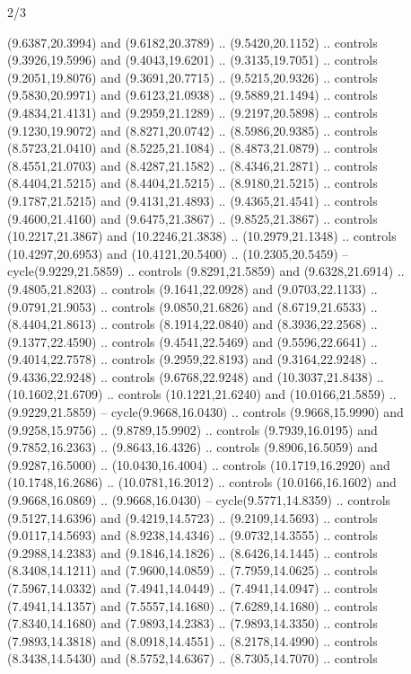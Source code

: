 \begin{flagdescription}{2/3}
\begin{scope}[yshift=\flagwidth,scale=\flagwidth/1241.93737]
\begin{scope}[y=-1mm, x=1mm,draw=gold,fill=blue,line join=miter,miter limit=4,line width=1.8\lw]
{  (9.6387,20.3994) and (9.6182,20.3789) .. (9.5420,20.1152) .. controls
  (9.3926,19.5996) and (9.4043,19.6201) .. (9.3135,19.7051) .. controls
  (9.2051,19.8076) and (9.3691,20.7715) .. (9.5215,20.9326) .. controls
  (9.5830,20.9971) and (9.6123,21.0938) .. (9.5889,21.1494) .. controls
  (9.4834,21.4131) and (9.2959,21.1289) .. (9.2197,20.5898) .. controls
  (9.1230,19.9072) and (8.8271,20.0742) .. (8.5986,20.9385) .. controls
  (8.5723,21.0410) and (8.5225,21.1084) .. (8.4873,21.0879) .. controls
  (8.4551,21.0703) and (8.4287,21.1582) .. (8.4346,21.2871) .. controls
  (8.4404,21.5215) and (8.4404,21.5215) .. (8.9180,21.5215) .. controls
  (9.1787,21.5215) and (9.4131,21.4893) .. (9.4365,21.4541) .. controls
  (9.4600,21.4160) and (9.6475,21.3867) .. (9.8525,21.3867) .. controls
  (10.2217,21.3867) and (10.2246,21.3838) .. (10.2979,21.1348) .. controls
  (10.4297,20.6953) and (10.4121,20.5400) .. (10.2305,20.5459) --
  cycle(9.9229,21.5859) .. controls (9.8291,21.5859) and (9.6328,21.6914) ..
  (9.4805,21.8203) .. controls (9.1641,22.0928) and (9.0703,22.1133) ..
  (9.0791,21.9053) .. controls (9.0850,21.6826) and (8.6719,21.6533) ..
  (8.4404,21.8613) .. controls (8.1914,22.0840) and (8.3936,22.2568) ..
  (9.1377,22.4590) .. controls (9.4541,22.5469) and (9.5596,22.6641) ..
  (9.4014,22.7578) .. controls (9.2959,22.8193) and (9.3164,22.9248) ..
  (9.4336,22.9248) .. controls (9.6768,22.9248) and (10.3037,21.8438) ..
  (10.1602,21.6709) .. controls (10.1221,21.6240) and (10.0166,21.5859) ..
  (9.9229,21.5859) -- cycle(9.9668,16.0430) .. controls (9.9668,15.9990) and
  (9.9258,15.9756) .. (9.8789,15.9902) .. controls (9.7939,16.0195) and
  (9.7852,16.2363) .. (9.8643,16.4326) .. controls (9.8906,16.5059) and
  (9.9287,16.5000) .. (10.0430,16.4004) .. controls (10.1719,16.2920) and
  (10.1748,16.2686) .. (10.0781,16.2012) .. controls (10.0166,16.1602) and
  (9.9668,16.0869) .. (9.9668,16.0430) -- cycle(9.5771,14.8359) .. controls
  (9.5127,14.6396) and (9.4219,14.5723) .. (9.2109,14.5693) .. controls
  (9.0117,14.5693) and (8.9238,14.4346) .. (9.0732,14.3555) .. controls
  (9.2988,14.2383) and (9.1846,14.1826) .. (8.6426,14.1445) .. controls
  (8.3408,14.1211) and (7.9600,14.0859) .. (7.7959,14.0625) .. controls
  (7.5967,14.0332) and (7.4941,14.0449) .. (7.4941,14.0947) .. controls
  (7.4941,14.1357) and (7.5557,14.1680) .. (7.6289,14.1680) .. controls
  (7.8340,14.1680) and (7.9893,14.2383) .. (7.9893,14.3350) .. controls
  (7.9893,14.3818) and (8.0918,14.4551) .. (8.2178,14.4990) .. controls
  (8.3438,14.5430) and (8.5752,14.6367) .. (8.7305,14.7070) .. controls
}
\end{scope}
\end{scope}
\end{flagdescription}
